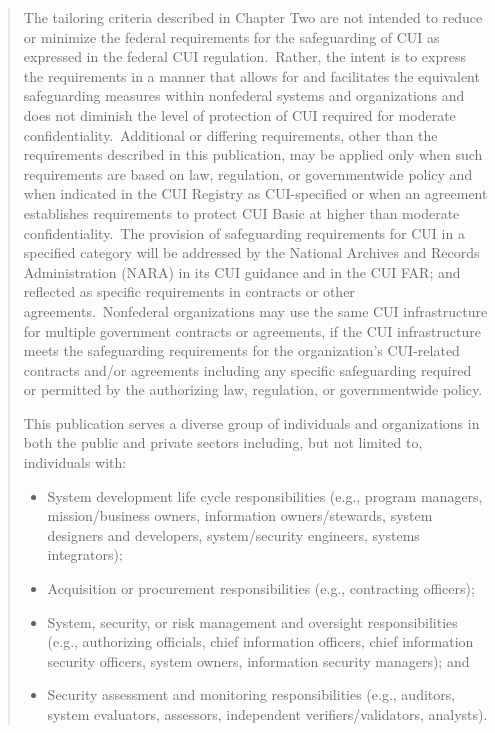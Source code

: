\begin{formal}
\begin{quote}
The tailoring criteria described in Chapter Two are not intended to reduce or minimize the federal requirements for the safeguarding of CUI as expressed in the federal CUI regulation.\ Rather, the intent is to express the requirements in a manner that allows for and facilitates the equivalent safeguarding measures within nonfederal systems and organizations and does not diminish the level of protection of CUI required for moderate confidentiality.\ Additional or differing requirements, other than the requirements described in this publication, may be applied only when such requirements are based on law, regulation, or governmentwide policy and when indicated in the CUI Registry as CUI-specified or when an agreement establishes requirements to protect CUI Basic at higher than moderate confidentiality.\ The provision of safeguarding requirements for CUI in a specified category will be addressed by the National Archives and Records Administration (NARA) in its CUI guidance and in the CUI FAR; and reflected as specific requirements in contracts or other agreements.\ Nonfederal organizations may use the same CUI infrastructure for multiple government contracts or agreements, if the CUI infrastructure meets the safeguarding requirements for the organization’s CUI-related contracts and/or agreements including any specific safeguarding required or permitted by the authorizing law, regulation, or governmentwide policy.
\vspace{10pt}

This publication serves a diverse group of individuals and organizations in both the public and private sectors including, but not limited to, individuals with:
\vspace{10pt}

\begin{itemize}
\item System development life cycle responsibilities (e.g., program managers, mission/business owners, information owners/stewards, system designers and developers, system/security engineers, systems integrators);
\item Acquisition or procurement responsibilities (e.g., contracting officers);
\item System, security, or risk management and oversight responsibilities (e.g., authorizing officials, chief information officers, chief information security officers, system owners, information security managers); and
\item Security assessment and monitoring responsibilities (e.g., auditors, system evaluators, assessors, independent verifiers/validators, analysts).
\end{itemize}
\vspace{10pt}


\end{quote}
\end{formal}
